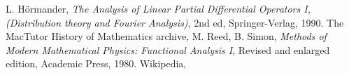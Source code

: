 \documentclass[12pt]{article}
\begin{document}
\begin{thebibliography}{9}
 L. H\"ormander, \emph{The Analysis of Linear Partial Differential Operators I,
 (Distribution theory and Fourier Analysis)}, 2nd ed, Springer-Verlag, 1990.
 The MacTutor History of Mathematics archive,
 M. Reed, B. Simon,
  \emph{Methods of Modern Mathematical Physics: Functional Analysis I},
Revised and enlarged edition,  Academic Press, 1980.
 Wikipedia, 
 \end{thebibliography}
\end{document}
